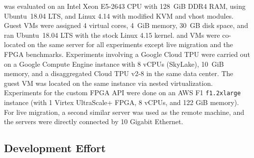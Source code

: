 \Model was evaluated on an Intel Xeon E5-2643 CPU with 128~GiB DDR4 RAM, using
Ubuntu~18.04 LTS, and Linux 4.14 with modified KVM and vhost modules.
Guest VMs were assigned 4 virtual cores, 4~GiB memory, 30~GB disk space, and ran Ubuntu~18.04 LTS with the stock Linux 4.15 kernel.
\workers and VMs were co-located on the same server for all experiments except live migration and the FPGA benchmarks.
Experiments involving a Google Cloud TPU were carried out on a Google Compute Engine instance with 8 vCPUs (SkyLake), 10~GiB memory, and a disaggregated Cloud TPU v2-8 in the same data center.
The guest VM was located on the same instance via nested virtualization.
Experiments for the custom FPGA API were done on an AWS F1 \lstinline|f1.2xlarge| instance (with 1 Virtex UltraScale+ FPGA, 8 vCPUs, and 122 GiB memory).
For live migration, a second similar server was used as the remote machine, and the servers were directly connected by 10 Gigabit Ethernet.

\subsection{Development Effort}
\label{s:eval_effort}


